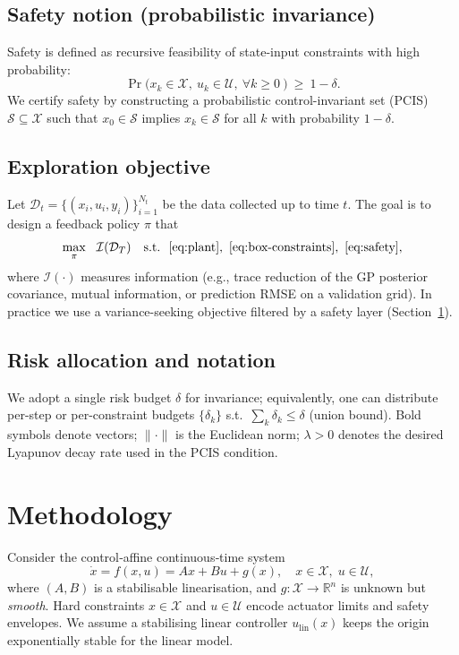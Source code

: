 \documentclass[10pt]{article}
\newcommand{\R}{\mathbb{R}}
\newcommand{\1}{\mathbbm{1}}
\begin{document}
\subsection{Safety notion (probabilistic invariance)}
Safety is defined as recursive feasibility of state-input constraints with high probability:
\begin{equation}\label{eq:safety}
\Pr\!\Big(x_k\in\mathcal X,\ u_k\in\mathcal U,\ \forall k\ge 0\ \Big)\ \ge\ 1-\delta.
\end{equation}
We certify safety by constructing a probabilistic control-invariant set (PCIS) \(\mathcal S\subseteq\mathcal X\) such that \(x_0\in\mathcal S\) implies \(x_k\in\mathcal S\) for all \(k\) with probability \(1-\delta\).


\subsection{Exploration objective}
Let \(\mathcal D_t=\{(x_i,u_i,y_i)\}_{i=1}^{N_t}\) be the data collected up to time \(t\). The goal is to design a feedback policy \(\pi\) that
\begin{equation}\label{eq:objective}
\max_{\pi}\ \ \mathcal I(\mathcal D_T)\quad
\text{s.t.}\ \ \eqref{eq:plant},\ \eqref{eq:box-constraints},\ \eqref{eq:safety},
\end{equation}
where \(\mathcal I(\cdot)\) measures information (e.g., trace reduction of the GP posterior covariance, mutual information, or prediction RMSE on a validation grid). In practice we use a variance-seeking objective filtered by a safety layer (Section~\ref{sec:method}).

\subsection{Risk allocation and notation}\label{subsec:risk}
We adopt a single risk budget \(\delta\) for invariance; equivalently, one can distribute per-step or per-constraint budgets \(\{\delta_k\}\) s.t.\ \(\sum_k \delta_k\le \delta\) (union bound). Bold symbols denote vectors; \(\|\cdot\|\) is the Euclidean norm; \(\lambda>0\) denotes the desired Lyapunov decay rate used in the PCIS condition.



\section{Methodology}\label{sec:method}

Consider the control‑affine continuous‑time system
\begin{equation}\label{eq:nonlin}
  \dot x = f(x,u) = Ax + Bu + g(x), \quad x\in\mathcal X,\; u\in\mathcal U,
\end{equation}
where $(A,B)$ is a stabilisable linearisation, and $g:\mathcal X\!\to\R^n$ is unknown but \emph{smooth}.  Hard constraints $x\in\mathcal X$ and $u\in\mathcal U$ encode actuator limits and safety envelopes.  We assume a stabilising linear controller $u_{\mathrm{lin}}(x)$ keeps the origin exponentially stable for the linear model.
\end{document}
